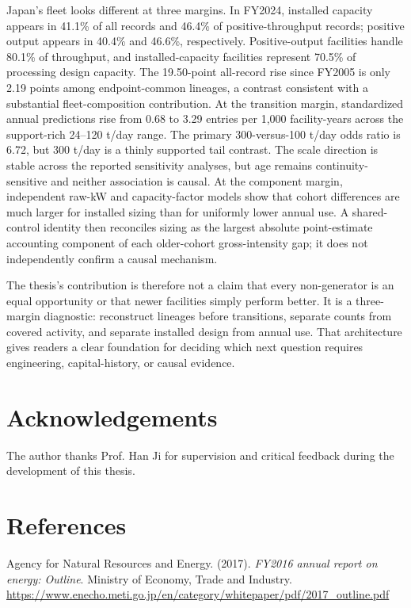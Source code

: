 \documentclass[12pt,letterpaper]{article}
\begin{document}
Japan's fleet looks different at three margins. In FY2024, installed capacity
appears in 41.1\% of all records and 46.4\% of positive-throughput records;
positive output appears in 40.4\% and 46.6\%, respectively. Positive-output
facilities handle 80.1\% of throughput, and installed-capacity facilities
represent 70.5\% of processing design capacity. The 19.50-point all-record rise
since FY2005 is only 2.19 points among endpoint-common lineages, a contrast
consistent with a substantial fleet-composition contribution. At the transition
margin, standardized annual predictions rise from 0.68 to 3.29 entries per
1,000 facility-years across the support-rich 24--120 t/day range. The primary
300-versus-100 t/day odds ratio is 6.72, but 300 t/day is a thinly supported tail
contrast. The scale direction is stable across the reported sensitivity analyses, but age remains
continuity-sensitive and neither association is causal. At the component
margin, independent raw-kW and capacity-factor models show that cohort
differences are much larger for installed sizing than for uniformly lower annual
use. A shared-control identity then reconciles sizing as the largest absolute
point-estimate accounting component of each older-cohort gross-intensity gap; it
does not independently
confirm a causal mechanism.

The thesis's contribution is therefore not a claim that every non-generator is
an equal opportunity or that newer facilities simply perform better. It is a
three-margin diagnostic: reconstruct lineages before transitions, separate
counts from covered activity, and separate installed design from annual use.
That architecture gives readers a clear foundation for
deciding which next question requires engineering, capital-history, or causal
evidence.

\section*{Acknowledgements}

The author thanks Prof. Han Ji for supervision and critical feedback during the
development of this thesis.

\section*{References}
\begingroup
\small
\setlength{\parindent}{0pt}
\setlength{\parskip}{0.55em}

Agency for Natural Resources and Energy. (2017). \textit{FY2016 annual report on
energy: Outline}. Ministry of Economy, Trade and Industry.
\url{https://www.enecho.meti.go.jp/en/category/whitepaper/pdf/2017_outline.pdf}
\end{document}
